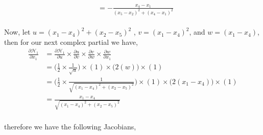 \documentclass[paper=a4, fontsize=11pt]{scrartcl} %
\numberwithin{equation}{section} %
\numberwithin{figure}{section} %
\numberwithin{table}{section} %
\begin{document}
\begin{framed}
\begin{align*}
    &= -\frac{x_4-x_1}{(x_5 - x_2)^2 + (x_4-x_1)^2}
\end{align*}
\\
Now, let $u=(x_1-x_4)^2 + (x_2-x_5)^2$ , $v=(x_1-x_4)^2$, and $w=(x_1-x_4)$, then for our next complex partial we have,
\\
\begin{align*}
    \frac{\partial{\mathcal{H}_1}}{\partial{x_1}} &= \frac{\partial{\mathcal{H}_1}}{\partial{u}} \times \frac{\partial{u}}{\partial{v}}\times \frac{\partial{v}}{\partial{w}} \times \frac{\partial{w}}{\partial{x_1}} \\
    &=  \bigg( \frac{1}{2} \times \frac{1}{\sqrt{u} } \bigg) \times (1) \times \bigg( 2(w)\bigg) \times(1) \\
    &=  \bigg( \frac{1}{2} \times \frac{1}{\sqrt{(x_1-x_4)^2+(x_2-x_5)^2} } \bigg) \times (1) \times \bigg( 2(x_1-x_4)\bigg) \times(1) \\
    &= \frac{x_1 - x_4}{\sqrt{(x_1-x_4)^2 + (x_2-x_5)^2}}
\end{align*}
\\

therefore we have the following Jacobians,


\end{framed}
\end{document}
